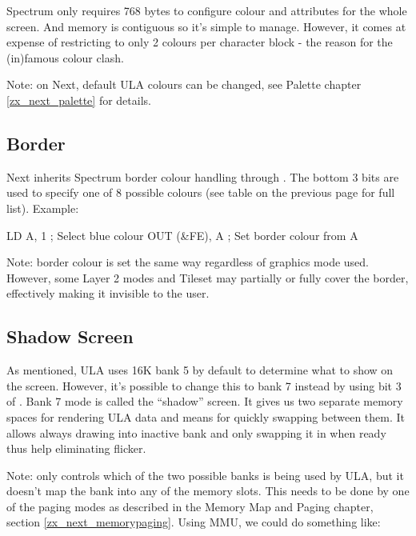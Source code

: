 Spectrum only requires 768 bytes to configure colour and attributes for the whole screen. And memory is contiguous so it's simple to manage. However, it comes at expense of restricting to only 2 colours per character block - the reason for the (in)famous colour clash.

Note: on Next, default ULA colours can be changed, see Palette chapter \ref{zx_next_palette} for details.


\subsection{Border}

Next inherits Spectrum border colour handling through . The bottom 3 bits are used to specify one of 8 possible colours (see table on the previous page for full list). Example:

\begin{tcblisting}{}
	LD A, 1			; Select blue colour
	OUT (&FE), A	; Set border colour from A
\end{tcblisting}

Note: border colour is set the same way regardless of graphics mode used. However, some Layer 2 modes and Tileset may partially or fully cover the border, effectively making it invisible to the user.


\subsection{Shadow Screen}

As mentioned, ULA uses 16K bank 5 by default to determine what to show on the screen. However, it's possible to change this to bank 7 instead by using bit 3 of . Bank 7 mode is called the ``shadow'' screen. It gives us two separate memory spaces for rendering ULA data and means for quickly swapping between them. It allows always drawing into inactive bank and only swapping it in when ready thus help eliminating flicker.

Note:  only controls which of the two possible banks is being used by ULA, but it doesn't map the bank into any of the memory slots. This needs to be done by one of the paging modes as described in the Memory Map and Paging chapter, section \ref{zx_next_memorypaging}. Using MMU, we could do something like:

